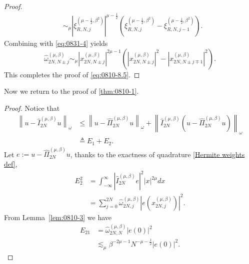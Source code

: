 \documentclass[pdflatex,sn-aps]{sn-jnl}%
\theoremstyle{thmstyleone}%
\theoremstyle{thmstyletwo}%
\theoremstyle{thmstylethree}%
\begin{document}
\begin{appendices}
\begin{proof}
\begin{equation}
\begin{aligned}
    & \sim_\mu\left|\xi_{R, N, j}^{\left(\mu-\frac{1}{2}, \beta^2\right)}\right|^{\mu-\frac{1}{2}}\left(\xi_{R, N, j}^{\left(\mu-\frac{1}{2}, \beta^2\right)}-\xi_{R, N, j-1}^{\left(\mu-\frac{1}{2}, \beta^2\right)}\right).
    \end{aligned}
  \end{equation}
  Combining with \eqref{eq:0831-4} yields
  \begin{equation}\label{eq:0903-15}
    \widehat{\omega}_{2 N, N \pm j}^{(\mu, \beta)} \sim_\mu\left|x_{2 N, N \pm j}^{(\mu, \beta)}\right|^{2 \mu-1}\left(\left|x_{2 N, N \pm j}^{(\mu, \beta)}\right|^2-\left|x_{2 N, N \pm j \mp 1}^{(\mu, \beta)}\right|^2\right).
  \end{equation}
  This completes the proof of \eqref{eq:0810-8.5}.
\end{proof}
Now we return to the proof of \autoref{thm:0810-1}.
\begin{proof}
  Notice that
  \begin{equation}\label{eq:0810-14}
    \begin{aligned}
    \left\|u-\widehat{I}_{2 N}^{(\mu, \beta)} u\right\|_\omega & \leqslant\left\|u-\widehat{\Pi}_{2 N}^{(\mu, \beta)} u\right\|_\omega+\left\|\widehat{I}_{2 N}^{(\mu, \beta)}\left(u-\widehat{\Pi}_{2 N}^{(\mu, \beta)} u\right)\right\|_\omega \\
    & \triangleq E_1+E_2.
    \end{aligned}
  \end{equation}
  Let $e:=u-\widehat{\Pi}_{2 N}^{(\mu, \beta)} u$, thanks to the
  exactness of quadrature \eqref{Hermite weights def},
  \begin{equation}\label{eq:0810-15}
    \begin{aligned}
    E_2^2 & =\int_{-\infty}^{\infty}\left|\widehat{I}_{2 N}^{(\mu, \beta)} e\right|^2|x|^{2 \mu} dx\\
    & =\sum_{j=0}^{2N} \widehat{\omega}_{2 N, j}^{(\mu, \beta)} \left|e\left(x_{2N,j}^{(\mu,\beta)}\right)\right|^2.
    \end{aligned}
  \end{equation}
  From Lemma~\ref{lem:0810-3} we have
  \begin{equation}\label{eq:0810-16}
    \begin{aligned}
      E_{21} & = \widehat{\omega}_{2 N, N}^{(\mu, \beta)}|e(0)|^2 \\
      & \lesssim_\mu \beta^{-2 \mu-1} N^{-\mu-\frac{1}{2}}|e(0)|^2.
    \end{aligned}
  \end{equation}

\end{proof}
\end{appendices}
\end{document}
